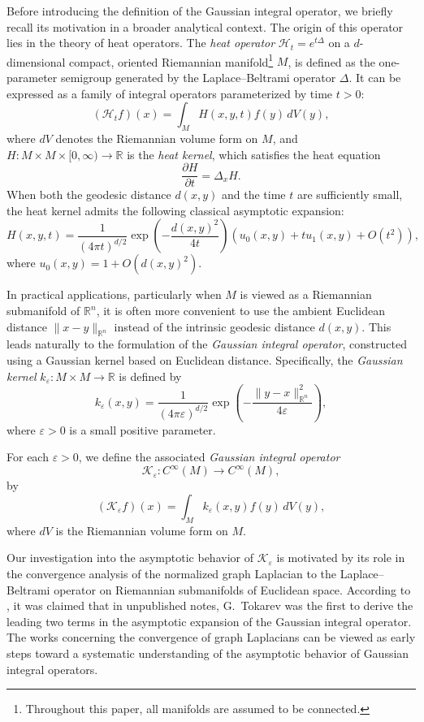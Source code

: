 \documentclass{amsart}
\theoremstyle{Theorem}
\theoremstyle{remark}
\numberwithin{equation}{section} \numberwithin{figure}{section}
\renewcommand*{\to}{\rightarrow}
\begin{document}
Before introducing the definition of the Gaussian integral operator, we briefly recall its motivation in a broader analytical context. The origin of this operator lies in the theory of heat operators. The \emph{heat operator} \( \mathcal{H}_t = e^{t\Delta} \) on a \( d \)-dimensional compact, oriented Riemannian manifold\footnote{Throughout this paper, all manifolds are assumed to be connected.} \( M \), is defined as the one-parameter semigroup generated by the Laplace–Beltrami operator \( \Delta \). It can be expressed as a family of integral operators parameterized by time \( t > 0 \):
\[
(\mathcal{H}_t f)(x) = \int_M H(x, y, t) f(y) \, dV(y),
\]
where \( dV \) denotes the Riemannian volume form on \( M \), and \( H : M \times M \times [0, \infty) \to \mathbb{R} \) is the \emph{heat kernel}, which satisfies the heat equation
\[
\frac{\partial H}{\partial t} = \Delta_x H.
\]
When both the geodesic distance \( d(x, y) \) and the time \( t \) are sufficiently small, the heat kernel admits the following classical asymptotic expansion:
\[
H(x, y, t) = \frac{1}{(4\pi t)^{d/2}} \exp\left(-\frac{d(x, y)^2}{4t}\right) \left( u_0(x, y) + t u_1(x, y) + O(t^2) \right),
\]
where \( u_0(x, y) = 1 + O(d(x, y)^2) \).

In practical applications, particularly when \( M \) is viewed as a Riemannian submanifold of \( \mathbb{R}^n \), it is often more convenient to use the ambient Euclidean distance \( \|x - y\|_{\mathbb{R}^n} \) instead of the intrinsic geodesic distance \( d(x, y) \). This leads naturally to the formulation of the \emph{Gaussian integral operator}, constructed using a Gaussian kernel based on Euclidean distance. Specifically, the \emph{Gaussian kernel} \( k_{\varepsilon} : M \times M \to \mathbb{R} \) is defined by
\[
k_{\varepsilon}(x, y) = \frac{1}{(4\pi\varepsilon)^{d/2}} \exp\left(-\frac{\|y - x\|_{\mathbb{R}^n}^2}{4\varepsilon}\right),
\]
where \( \varepsilon > 0 \) is a small positive parameter.

For each \( \varepsilon > 0 \), we define the associated \emph{Gaussian integral operator}
\[
\mathcal{K}_\varepsilon : C^\infty(M) \to C^\infty(M),
\]
by
\[
(\mathcal{K}_\varepsilon f)(x) = \int_M k_\varepsilon(x, y) f(y) \, dV(y),
\]
where \( dV \) is the Riemannian volume form on \( M \).

Our investigation into the asymptotic behavior of \( \mathcal{K}_\varepsilon \) is motivated by its role in the convergence analysis of the normalized graph Laplacian to the Laplace–Beltrami operator on Riemannian submanifolds of Euclidean space. According to \cite{S2}, it was claimed that in unpublished notes, G.~Tokarev was the first to derive the leading two terms in the asymptotic expansion of the Gaussian integral operator. The works concerning the convergence of graph Laplacians can be viewed as early steps toward a systematic understanding of the asymptotic behavior of Gaussian integral operators.
\end{document}
